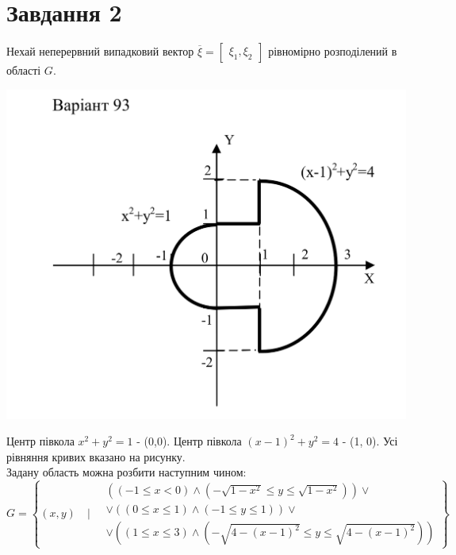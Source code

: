 \documentclass[14pt,a4paper]{scrartcl}
\theoremstyle{definition}
\theoremstyle{remark}
\theoremstyle{definition}
\theoremstyle{definition}
\begin{document}
\newpage

\section{Завдання 2}
\vfill

Нехай неперервний
випадковий вектор $\overline{\xi} = \begin{bmatrix}
 \xi_1, \xi_2
\end{bmatrix}$ рівномірно розподілений в області $G$.
\begin{center} \includegraphics[scale=0.44]{assets/graph2.png} \end{center}
\vfill

Центр півкола $x^2 + y^2 = 1$ - (0,0). Центр півкола $(x-1)^2 + y^2 = 4$ - (1, 0). Усі рівняння кривих вказано на рисунку.\\
\vfill
Задану область можна розбити наступним чином:
$$G = \left\lbrace (x,y) \quad \Bigg| \quad
\begin{gathered}
  \left(
(-1 \leq x < 0) \land ( -\sqrt{1 -x^2} \leq y \leq  \sqrt{1-x^2})
\right)  \lor \\ \lor \left(
(0 \leq  x \leq 1) \land (-1 \leq y \leq 1)
	 \right)\lor \\ \lor \left(
(1 \leq  x\leq  3) \land (-\sqrt{4 -(x-1)^2}\leq  y \leq\sqrt{4 - (x-1)^2})
\right)
\end{gathered}    \right\rbrace  $$
\vfill

\newpage
\end{document}

